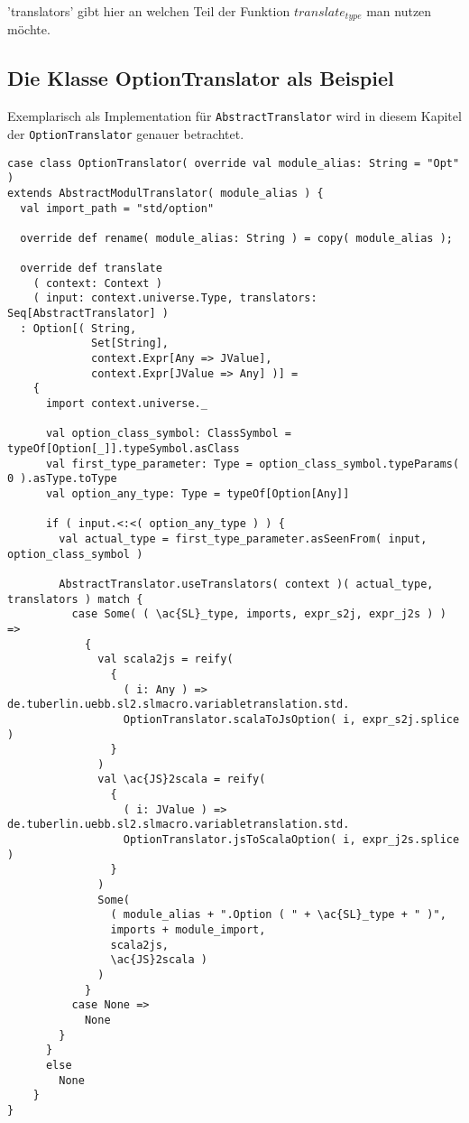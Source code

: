 \documentclass[12pt]{scrreprt}
\begin{document}
'translators' gibt hier an welchen Teil der Funktion $translate_{type}$ man nutzen möchte.

\subsection{Die Klasse OptionTranslator als Beispiel}

Exemplarisch als Implementation für \lstinline!AbstractTranslator! wird in diesem Kapitel der \lstinline!OptionTranslator! genauer betrachtet.

\begin{lstlisting}[caption=Source Code von OptionTranslator, label=lst:source option translator]
case class OptionTranslator( override val module_alias: String = "Opt" ) 
extends AbstractModulTranslator( module_alias ) {
  val import_path = "std/option"

  override def rename( module_alias: String ) = copy( module_alias );
  
  override def translate
    ( context: Context )
    ( input: context.universe.Type, translators: Seq[AbstractTranslator] )
  : Option[( String, 
             Set[String], 
             context.Expr[Any => JValue], 
             context.Expr[JValue => Any] )] =
    {
      import context.universe._

      val option_class_symbol: ClassSymbol = typeOf[Option[_]].typeSymbol.asClass
      val first_type_parameter: Type = option_class_symbol.typeParams( 0 ).asType.toType
      val option_any_type: Type = typeOf[Option[Any]]

      if ( input.<:<( option_any_type ) ) {
        val actual_type = first_type_parameter.asSeenFrom( input, option_class_symbol )

        AbstractTranslator.useTranslators( context )( actual_type, translators ) match {
          case Some( ( \ac{SL}_type, imports, expr_s2j, expr_j2s ) ) =>
            {
              val scala2js = reify( 
                { 
                  ( i: Any ) => de.tuberlin.uebb.sl2.slmacro.variabletranslation.std.
                  OptionTranslator.scalaToJsOption( i, expr_s2j.splice ) 
                } 
              )
              val \ac{JS}2scala = reify( 
                { 
                  ( i: JValue ) => de.tuberlin.uebb.sl2.slmacro.variabletranslation.std.
                  OptionTranslator.jsToScalaOption( i, expr_j2s.splice ) 
                } 
              )
              Some( 
                ( module_alias + ".Option ( " + \ac{SL}_type + " )", 
                imports + module_import, 
                scala2js, 
                \ac{JS}2scala ) 
              )
            }
          case None =>
            None
        }
      }
      else
        None
    }
}


\end{lstlisting}
\end{document}
